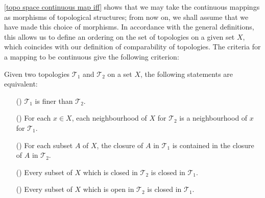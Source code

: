 \cref{topo space continuous map iff} shows that we may take the continuous mappings as morphisms of topological structures; from now on, we shall assume that we have made this choice of morphisms. In accordance with the general definitions, this allows us to define an ordering on the set of topologies on a given set $X$, which coincides with our definition of comparability of topologies. The criteria for a mapping to be continuous give the following criterion:
\begin{proposition}\label{topo space finer topology iff}
Given two topologies $\mathcal{T}_1$ and $\mathcal{T}_2$ on a set $X$, the following statements are equivalent:
\begin{itemize}
\item[(\rmnum{1})] $\mathcal{T}_1$ is finer than $\mathcal{T}_2$.
\item[(\rmnum{2})] For each $x\in X$, each neighbourhood of $X$ for $\mathcal{T}_2$ is a neighbourhood of $x$ for $\mathcal{T}_1$.
\item[(\rmnum{3})] For each subset $A$ of $X$, the closure of $A$ in $\mathcal{T}_1$ is contained in the closure of $A$ in $\mathcal{T}_2$.
\item[(\rmnum{4})] Every subset of $X$ which is closed in $\mathcal{T}_2$ is closed in $\mathcal{T}_1$.
\item[(\rmnum{5})] Every subset of $X$ which is open in $\mathcal{T}_2$ is closed in $\mathcal{T}_1$.
\end{itemize}
\end{proposition}

